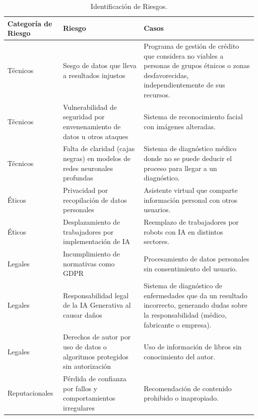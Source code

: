 \documentclass[12pt]{article}
\begin{document}
\begin{table}[h]
    \centering
    \begin{tabular}{p{3cm}p{5cm}p{6cm}}
        \toprule
        \textbf{Categoría de Riesgo} & \textbf{Riesgo} & \textbf{Casos} \\
        \midrule
        Técnicos & Sesgo de datos que lleva a resultados injustos & Programa de gestión de crédito que considera no viables a personas de grupos étnicos o zonas desfavorecidas, independientemente de sus recursos. \\
        Técnicos & Vulnerabilidad de seguridad por envenenamiento de datos u otros ataques & Sistema de reconocimiento facial con imágenes alteradas. \\
        Técnicos & Falta de claridad (cajas negras) en modelos de redes neuronales profundas & Sistema de diagnóstico médico donde no se puede deducir el proceso para llegar a un diagnóstico. \\
        Éticos & Privacidad por recopilación de datos personales & Asistente virtual que comparte información personal con otros usuarios. \\
        Éticos & Desplazamiento de trabajadores por implementación de IA & Reemplazo de trabajadores por robots con IA en distintos sectores. \\
        Legales & Incumplimiento de normativas como GDPR & Procesamiento de datos personales sin consentimiento del usuario. \\
        Legales & Responsabilidad legal de la IA Generativa al causar daños & Sistema de diagnóstico de enfermedades que da un resultado incorrecto, generando dudas sobre la responsabilidad (médico, fabricante o empresa). \\
        Legales & Derechos de autor por uso de datos o algoritmos protegidos sin autorización & Uso de información de libros sin conocimiento del autor. \\
        Reputacionales & Pérdida de confianza por fallos y comportamientos irregulares & Recomendación de contenido prohibido o inapropiado. \\
        \bottomrule
    \end{tabular}
    \caption{Identificación de Riesgos.}
    \label{tab:identificacion_riesgos}
\end{table}
\end{document}
